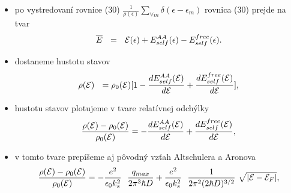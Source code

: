 \documentclass[
	11pt, %
]{beamer}
\begin{document}
\begin{frame}

\begin{itemize}
\item po vystredovaní rovnice (30) $\frac{1}{\rho(\epsilon)}\sum_{\forall m} \delta(\epsilon-\epsilon_{m})$
rovnica (30) prejde na tvar
\begin{equation}
\label{eq:energia}
 \overline{E} \ \ = \ \ \mathcal{E}(\epsilon) + E_{self}^{AA}(\epsilon) - E_{self}^{free}(\epsilon)  \text{.}
\end{equation}
\item dostaneme hustotu stavov
 \begin{equation}\label{eq:erg_meandis nex prepis skratka7}
\rho(\mathcal{E}) \ \ = \rho_0(\mathcal{E}) [1 - \frac{dE_{self}^{AA}(\mathcal{E})}{d\mathcal{E}} + \frac{dE_{self}^{free}(\mathcal{E})}{d\mathcal{E}}] \text{,}
\end{equation}

\item hustotu stavov plotujeme v tvare relatívnej odchýlky
\begin{equation}\label{eq:erg_hustota stavov relat}
\frac{\rho(\mathcal{E}) - \rho_0(\mathcal{E})}{\rho_0(\mathcal{E})} = - \frac{dE_{self}^{AA}(\mathcal{E})}{d\mathcal{E}} + \frac{dE_{self}^{free}(\mathcal{E})}{d\mathcal{E}} \text{,}
\end{equation}
\item v tomto tvare prepíšeme aj pôvodný vzťah Altschulera a Aronova
\begin{equation}\label{eq:erg_hustota stavov relat povodny}
\frac{\rho(\mathcal{E}) - \rho_0(\mathcal{E})}{\rho_0(\mathcal{E})} = - \frac{e^{2}}{\epsilon_0 k_s^{2}}\ \  \frac{q_{max}}{2\pi^3 \hbar D}
 +  \frac{e^{2}}{\epsilon_0 k_s^{2}} \ \ \frac{1}{2\pi^2 (2\hbar D)^{3/2}}  \ \sqrt{|\mathcal{E}-\mathcal{E}_F|} \text{,}
\end{equation}
\end{itemize}
\end{frame}
\end{document}
